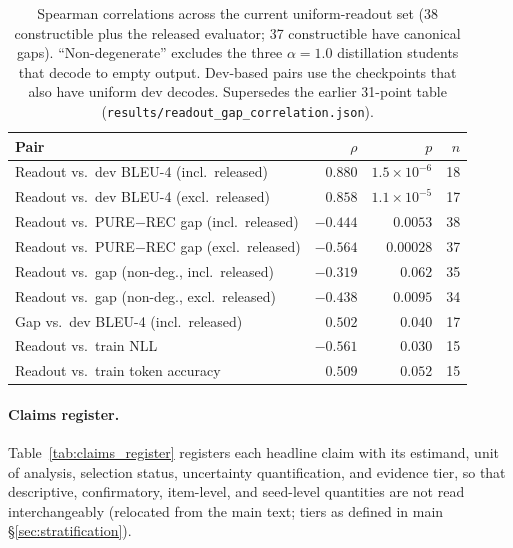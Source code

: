 \documentclass[pdflatex,sn-chicago]{sn-jnl}
\begin{document}
\begin{table}[h]
\centering
\small
\caption{Spearman correlations across the current uniform-readout set (38 constructible plus the released evaluator; 37 constructible have canonical gaps). ``Non-degenerate'' excludes the three $\alpha{=}1.0$ distillation students that decode to empty output. Dev-based pairs use the checkpoints that also have uniform dev decodes. Supersedes the earlier 31-point table (\texttt{results/readout\_gap\_correlation.json}).}
\label{tab:readout_assoc}
\begin{tabular}{lrrr}
\toprule
Pair & $\rho$ & $p$ & $n$ \\
\midrule
Readout vs.\ dev BLEU-4 (incl.\ released) & $0.880$ & $1.5\times10^{-6}$ & 18 \\
Readout vs.\ dev BLEU-4 (excl.\ released) & $0.858$ & $1.1\times10^{-5}$ & 17 \\
Readout vs.\ PURE$-$REC gap (incl.\ released) & $-0.444$ & $0.0053$ & 38 \\
Readout vs.\ PURE$-$REC gap (excl.\ released) & $-0.564$ & $0.00028$ & 37 \\
Readout vs.\ gap (non-deg., incl.\ released) & $-0.319$ & $0.062$ & 35 \\
Readout vs.\ gap (non-deg., excl.\ released) & $-0.438$ & $0.0095$ & 34 \\
Gap vs.\ dev BLEU-4 (incl.\ released) & $0.502$ & $0.040$ & 17 \\
Readout vs.\ train NLL & $-0.561$ & $0.030$ & 15 \\
Readout vs.\ train token accuracy & $0.509$ & $0.052$ & 15 \\
\bottomrule
\end{tabular}
\end{table}

\paragraph{Claims register.}
Table~\ref{tab:claims_register} registers each headline claim with its estimand, unit of analysis, selection status, uncertainty quantification, and evidence tier, so that descriptive, confirmatory, item-level, and seed-level quantities are not read interchangeably (relocated from the main text; tiers as defined in main \S\ref{sec:stratification}).
\end{document}
